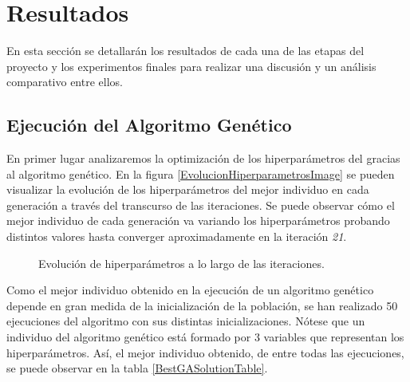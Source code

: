\clearpage

\thispagestyle{plain}
\chapter{Resultados}
\label{resultados}

  En esta sección se detallarán los resultados de cada una de las etapas del proyecto y los experimentos finales para realizar una discusión y un análisis comparativo entre ellos.

\section{Ejecución del Algoritmo Genético}

  En primer lugar analizaremos la optimización de los hiperparámetros del  gracias al algoritmo genético. En la figura \eqref{EvolucionHiperparametrosImage} se pueden visualizar la evolución de los hiperparámetros del mejor individuo en cada generación a través del transcurso de las iteraciones. Se puede observar cómo el mejor individuo de cada generación va variando los hiperparámetros probando distintos valores hasta converger aproximadamente en la iteración \textit{21}.

  \begin{figure}[h]
      \centering
      
      \caption{Evolución de hiperparámetros a lo largo de las iteraciones.}
      \label{EvolucionHiperparametrosImage}
   \end{figure}



  Como el mejor individuo obtenido en la ejecución de un algoritmo genético depende en gran medida de la inicialización de la población, se han realizado 50 ejecuciones del algoritmo con sus distintas inicializaciones. Nótese que un individuo del algoritmo genético está formado por 3 variables que representan los hiperparámetros. Así, el mejor individuo obtenido, de entre todas las ejecuciones, se puede observar en la tabla \eqref{BestGASolutionTable}.

